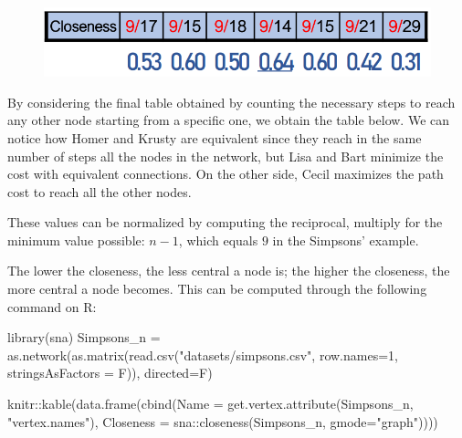 \documentclass[
  notitlepage,
  onecolumn,
  openany]{book}
\newenvironment{Shaded}{\begin{snugshade}}{\end{snugshade}}
\newcommand{\AttributeTok}[1]{\textcolor[rgb]{0.77,0.63,0.00}{#1}}
\newcommand{\DecValTok}[1]{\textcolor[rgb]{0.00,0.00,0.81}{#1}}
\newcommand{\FunctionTok}[1]{\textcolor[rgb]{0.00,0.00,0.00}{#1}}
\newcommand{\NormalTok}[1]{#1}
\newcommand{\OtherTok}[1]{\textcolor[rgb]{0.56,0.35,0.01}{#1}}
\newcommand{\SpecialCharTok}[1]{\textcolor[rgb]{0.00,0.00,0.00}{#1}}
\newcommand{\StringTok}[1]{\textcolor[rgb]{0.31,0.60,0.02}{#1}}
\begin{document}
\begin{figure}[h!]

{\centering \includegraphics[width=0.5\linewidth]{images/04-Centrality/Untitled 2} 

}

\end{figure}

By considering the final table obtained by counting the necessary steps to reach any other node starting from a specific one, we obtain the table below. We can notice how Homer and Krusty are equivalent since they reach in the same number of steps all the nodes in the network, but Lisa and Bart minimize the cost with equivalent connections. On the other side, Cecil maximizes the path cost to reach all the other nodes.

These values can be normalized by computing the reciprocal, multiply for the minimum value possible: \(n-1\), which equals \(9\) in the Simpsons' example.

The lower the closeness, the less central a node is; the higher the closeness, the more central a node becomes. This can be computed through the following command on R:

\begin{Shaded}
\begin{Highlighting}[]
\FunctionTok{library}\NormalTok{(sna)}
\NormalTok{Simpsons\_n }\OtherTok{=} \FunctionTok{as.network}\NormalTok{(}\FunctionTok{as.matrix}\NormalTok{(}\FunctionTok{read.csv}\NormalTok{(}\StringTok{"datasets/simpsons.csv"}\NormalTok{, }
                                           \AttributeTok{row.names=}\DecValTok{1}\NormalTok{, }
                                           \AttributeTok{stringsAsFactors =}\NormalTok{ F)),}
                        \AttributeTok{directed=}\NormalTok{F)}

\NormalTok{knitr}\SpecialCharTok{::}\FunctionTok{kable}\NormalTok{(}\FunctionTok{data.frame}\NormalTok{(}\FunctionTok{cbind}\NormalTok{(}\AttributeTok{Name =} \FunctionTok{get.vertex.attribute}\NormalTok{(Simpsons\_n, }\StringTok{"vertex.names"}\NormalTok{),}
                 \AttributeTok{Closeness =}\NormalTok{ sna}\SpecialCharTok{::}\FunctionTok{closeness}\NormalTok{(Simpsons\_n, }\AttributeTok{gmode=}\StringTok{"graph"}\NormalTok{))))}
\end{Highlighting}
\end{Shaded}
\end{document}
